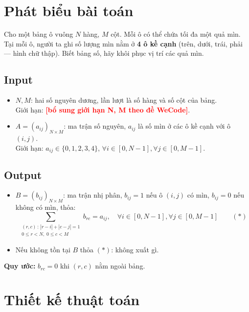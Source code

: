 \documentclass[12pt,a4paper]{article}
\newcommand{\todo}[1]{\textcolor{red}{\textbf{[#1]}}}
\begin{document}
\section{Phát biểu bài toán}

Cho một bảng ô vuông $N$ hàng, $M$ cột. Mỗi ô có thể chứa tối đa một quả mìn. Tại mỗi ô, người ta ghi số lượng mìn nằm ở \textbf{4 ô kề cạnh} (trên, dưới, trái, phải --- hình chữ thập). Biết bảng số, hãy khôi phục vị trí các quả mìn.

\subsection*{Input}
\begin{itemize}
    \item $N, M$: hai số nguyên dương, lần lượt là số hàng và số cột của bảng. \\
    Giới hạn: \todo{bổ sung giới hạn N, M theo đề WeCode}.
    \item $A = (a_{ij})_{N \times M}$: ma trận số nguyên, $a_{ij}$ là số mìn ở các ô kề cạnh với ô $(i, j)$. \\
    Giới hạn: $a_{ij} \in \{0, 1, 2, 3, 4\}$, $\forall i \in [0, N-1], \forall j \in [0, M-1]$.
\end{itemize}

\subsection*{Output}
\begin{itemize}
    \item $B = (b_{ij})_{N \times M}$: ma trận nhị phân, $b_{ij} = 1$ nếu ô $(i, j)$ có mìn, $b_{ij} = 0$ nếu không có mìn, thỏa:
    $$\sum_{\substack{(r, c) \,:\, |r - i| + |c - j| = 1 \\ 0 \le r < N,\; 0 \le c < M}} b_{rc} = a_{ij}, \quad \forall i \in [0, N-1], \forall j \in [0, M-1] \qquad (\ast)$$
    \item Nếu không tồn tại $B$ thỏa $(\ast)$: không xuất gì.
\end{itemize}

\noindent\textbf{Quy ước:} $b_{rc} = 0$ khi $(r, c)$ nằm ngoài bảng.

\section{Thiết kế thuật toán}
\end{document}
